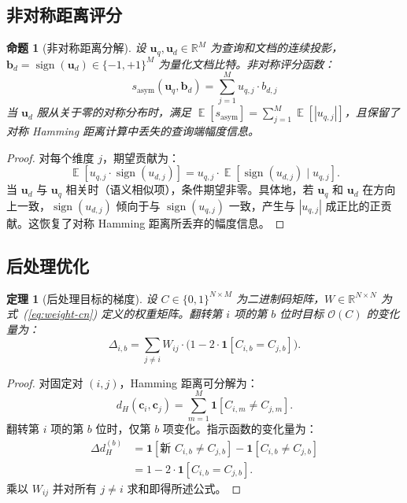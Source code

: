 \documentclass[11pt,a4paper]{article}
\newtheorem{theorem}{定理}
\newtheorem{proposition}{命题}
\DeclareMathOperator{\sign}{sign}
\DeclareMathOperator{\E}{\mathbb{E}}
\begin{document}
\subsection{非对称距离评分}

\begin{proposition}[非对称距离分解]\label{prop:asym-cn}
设 $\mathbf{u}_q, \mathbf{u}_d \in \mathbb{R}^M$ 为查询和文档的连续投影，$\mathbf{b}_d = \sign(\mathbf{u}_d) \in \{-1,+1\}^M$ 为量化文档比特。非对称评分函数：
\begin{equation}
    s_{\text{asym}}(\mathbf{u}_q, \mathbf{b}_d) = \sum_{j=1}^{M} u_{q,j} \cdot b_{d,j}
\end{equation}
当 $\mathbf{u}_d$ 服从关于零的对称分布时，满足 $\E[s_{\text{asym}}] = \sum_{j=1}^{M} \E[|u_{q,j}|]$，且保留了对称 Hamming 距离计算中丢失的查询端幅度信息。
\end{proposition}

\begin{proof}
对每个维度 $j$，期望贡献为：
\begin{equation}
    \E[u_{q,j} \cdot \sign(u_{d,j})] = u_{q,j} \cdot \E[\sign(u_{d,j}) \mid u_{q,j}].
\end{equation}
当 $\mathbf{u}_d$ 与 $\mathbf{u}_q$ 相关时（语义相似项），条件期望非零。具体地，若 $\mathbf{u}_q$ 和 $\mathbf{u}_d$ 在方向上一致，$\sign(u_{d,j})$ 倾向于与 $\sign(u_{q,j})$ 一致，产生与 $|u_{q,j}|$ 成正比的正贡献。这恢复了对称 Hamming 距离所丢弃的幅度信息。
\end{proof}

\subsection{后处理优化}

\begin{theorem}[后处理目标的梯度]\label{thm:post-grad-cn}
设 $C \in \{0,1\}^{N \times M}$ 为二进制码矩阵，$W \in \mathbb{R}^{N \times N}$ 为式~(\ref{eq:weight-cn}) 定义的权重矩阵。翻转第 $i$ 项的第 $b$ 位时目标 $\mathcal{O}(C)$ 的变化量为：
\begin{equation}
    \Delta_{i,b} = \sum_{j \neq i} W_{ij} \cdot \bigl(1 - 2\cdot\mathbf{1}[C_{i,b} = C_{j,b}]\bigr).
\end{equation}
\end{theorem}

\begin{proof}
对固定对 $(i,j)$，Hamming 距离可分解为：
\begin{equation}
    d_H(\mathbf{c}_i, \mathbf{c}_j) = \sum_{m=1}^{M} \mathbf{1}[C_{i,m} \neq C_{j,m}].
\end{equation}
翻转第 $i$ 项的第 $b$ 位时，仅第 $b$ 项变化。指示函数的变化量为：
\begin{align}
    \Delta d_H^{(b)} &= \mathbf{1}[\text{新 } C_{i,b} \neq C_{j,b}] - \mathbf{1}[C_{i,b} \neq C_{j,b}] \\
    &= 1 - 2\cdot\mathbf{1}[C_{i,b} = C_{j,b}].
\end{align}
乘以 $W_{ij}$ 并对所有 $j \neq i$ 求和即得所述公式。
\end{proof}
\end{document}
